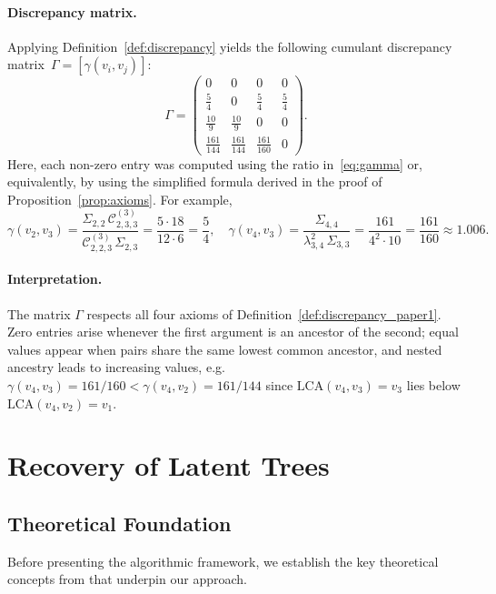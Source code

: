 \documentclass[11pt,a4paper]{article}
\numberwithin{equation}{section}
\begin{document}
\paragraph{Discrepancy matrix.}
Applying Definition~\ref{def:discrepancy} yields the following cumulant discrepancy matrix~$\Gamma=[\gamma(v_i,v_j)]$:
\[
\Gamma
=
\begin{pmatrix}
 0 & 0 & 0 & 0\\[0.2ex]
 \frac{5}{4} & 0 & \frac{5}{4} & \frac{5}{4}\\[0.4ex]
 \frac{10}{9} & \frac{10}{9} & 0 & 0\\[0.4ex]
 \frac{161}{144} & \frac{161}{144} & \frac{161}{160} & 0
\end{pmatrix}.
\]
Here, each non-zero entry was computed using the ratio in~\eqref{eq:gamma} or, equivalently, by using the simplified formula derived in the proof of Proposition~\ref{prop:axioms}.  For example,
\[
  \gamma(v_2,v_3)
  = \frac{\Sigma_{2,2}\,\mathcal{C}^{(3)}_{2,3,3}}
         {\mathcal{C}^{(3)}_{2,2,3}\,\Sigma_{2,3}}
  = \frac{5 \cdot 18}{12\cdot 6} = \frac{5}{4},
  \quad
  \gamma(v_4,v_3)
  = \frac{\Sigma_{4,4}}{\lambda_{3,4}^2\,\Sigma_{3,3}}
  = \frac{161}{4^2\cdot 10} = \frac{161}{160}\approx 1.006.
\]

\paragraph{Interpretation.}
The matrix $\Gamma$ respects all four axioms of Definition~\ref{def:discrepancy_paper1}.  Zero entries arise whenever the first argument is an ancestor of the second; equal values appear when pairs share the same lowest common ancestor, and nested ancestry leads to increasing values, e.g.\ $\gamma(v_4,v_3)=161/160<\gamma(v_4,v_2)=161/144$ since $\mathrm{LCA}(v_4,v_3)=v_3$ lies below $\mathrm{LCA}(v_4,v_2)=v_1$.


\section{Recovery of Latent Trees}
\label{sec:algorithm}

\subsection{Theoretical Foundation}

Before presenting the algorithmic framework, we establish the key theoretical concepts from \citet{etesami:kiyavash:coleman:2016} that underpin our approach.
\end{document}
